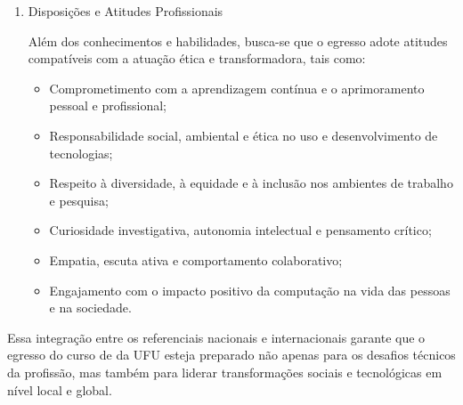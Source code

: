 \begin{enumerate}[label=\Roman*.]
\begin{itemize}
    \item Raciocínio lógico, computacional e analítico para resolver problemas complexos;
    \item Capacidade de abstração, modelagem e decomposição de sistemas;
    \item Comunicação eficaz com públicos técnicos e não técnicos, em diferentes meios e idiomas;
    \item Capacidade de colaboração em equipes interdisciplinares e multiculturais;
    \item Adaptabilidade a novos contextos tecnológicos e metodológicos;
    \item Organização e gestão do tempo e do próprio aprendizado;
    \item Liderança técnica em projetos, com tomada de decisão embasada e eficaz;
    \item Capacidade de avaliação crítica de sistemas computacionais e inovação tecnológica.
\end{itemize}

\item Disposições e Atitudes Profissionais~\cite{ACM:CC2020}

Além dos conhecimentos e habilidades, busca-se que o egresso adote atitudes compatíveis com a atuação ética e transformadora, tais como:

\begin{itemize}
    \item Comprometimento com a aprendizagem contínua e o aprimoramento pessoal e profissional;
    \item Responsabilidade social, ambiental e ética no uso e desenvolvimento de tecnologias;
    \item Respeito à diversidade, à equidade e à inclusão nos ambientes de trabalho e pesquisa;
    \item Curiosidade investigativa, autonomia intelectual e pensamento crítico;
    \item Empatia, escuta ativa e comportamento colaborativo;
    \item Engajamento com o impacto positivo da computação na vida das pessoas e na sociedade.
\end{itemize}
\end{enumerate}

Essa integração entre os referenciais nacionais e internacionais garante que o egresso do curso de \nomecursonovo da UFU esteja preparado não apenas para os desafios técnicos da profissão, mas também para liderar transformações sociais e tecnológicas em nível local e global.

